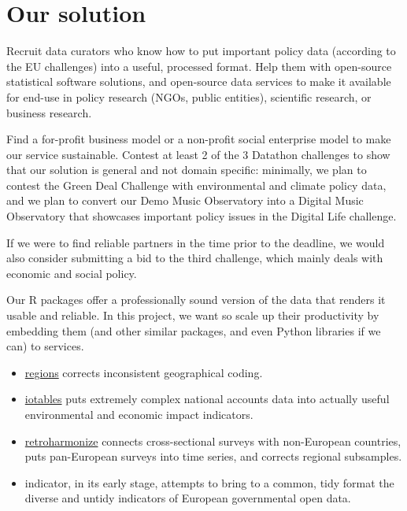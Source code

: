 \documentclass[
  a4paper,
  openany, a4paper, oneside]{book}
\providecommand{\tightlist}{%
  \setlength{\itemsep}{0pt}\setlength{\parskip}{0pt}}
\begin{document}
\hypertarget{our-solution}{%
\section*{Our solution}\label{our-solution}}

Recruit data curators who know how to put important policy data (according to the EU challenges) into a useful, processed format.
Help them with open-source statistical software solutions, and open-source data services to make it available for end-use in policy research (NGOs, public entities), scientific research, or business research.

Find a for-profit business model or a non-profit social enterprise model to make our service sustainable.
Contest at least 2 of the 3 Datathon challenges to show that our solution is general and not domain specific: minimally, we plan to contest the Green Deal Challenge with environmental and climate policy data, and we plan to convert our Demo Music Observatory into a Digital Music Observatory that showcases important policy issues in the Digital Life challenge.

If we were to find reliable partners in the time prior to the deadline, we would also consider submitting a bid to the third challenge, which mainly deals with economic and social policy.

Our R packages offer a professionally sound version of the data that renders it usable and reliable. In this project, we want so scale up their productivity by embedding them (and other similar packages, and even Python libraries if we can) to services.

\begin{itemize}
\tightlist
\item
  \href{https://regions.dataobservatory.eu/}{regions} corrects inconsistent geographical coding.
\item
  \href{https://iotables.dataobservatory.eu/}{iotables} puts extremely complex national accounts data into actually useful environmental and economic impact indicators.
\item
  \href{https://retroharmonize.dataobservatory.eu/}{retroharmonize} connects cross-sectional surveys with non-European countries, puts pan-European surveys into time series, and corrects regional subsamples.
\item
  indicator, in its early stage, attempts to bring to a common, tidy format the diverse and untidy indicators of European governmental open data.
\end{itemize}
\end{document}
